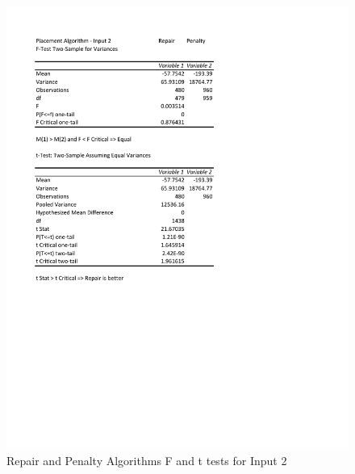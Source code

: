 \documentclass[times]{article}
\begin{document}
	\begin{figure}
		\caption{Repair and Penalty Algorithms F and t tests for Input 2}
		\label{fig:repair_penalty2}
		\includegraphics[width=\textwidth]{./t_test/Repair_Penalty2}
	\end{figure}
\end{document}
